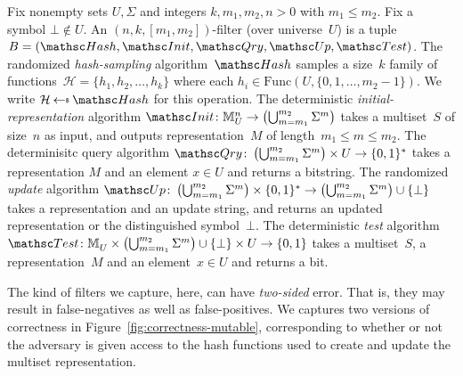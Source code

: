 Fix nonempty sets $U,\Sigma$ and integers $k,m_1,m_2,n>0$ with $m_1 \leq m_2$.  Fix a symbol $\bot \not\in U$.  An $(n,k,[m_1,m_2])$-filter (over universe~$U$) is a tuple  $B=(\Hash,\Init,\Qry,\Update, \Test)$.   
%
The randomized \emph{hash-sampling} algorithm~$\Hash$ samples a size~$k$ family of functions~$\mathcal{H}=\{h_1,h_2,\ldots,h_k\}$ where each $h_i \in  \mathrm{Func}(U,\{0,1,\ldots,m_2-1\})$.  We write $\mathcal{H} \getsr \Hash$ for this operation. 
%
The deterministic \emph{initial-representation} algorithm $\Init\colon \multiset{U}{n} \rightarrow \left(\bigcup_{m=m_1}^{m_2}\Sigma^m\right)$ takes a multiset~$S$ of size~$n$ as input, and outputs representation~$M$ of length~$m_1 \leq m \leq m_2$.
%
The determinisitc query algorithm $\Qry\colon \left(\bigcup_{m=m_1}^{m_2}\Sigma^m \right)\times U \rightarrow \bits^*$ takes a representation $M$ and an element $x \in U$ and returns a bitstring.  
%
The randomized \emph{update} algorithm $\Update\colon \left(\bigcup_{m=m_1}^{m_2}\Sigma^m \right)\times \bits^* \rightarrow \left(\bigcup_{m=m_1}^{m_2}\Sigma^m \right) \cup \{\bot\}$ takes a representation and an update string, and returns an updated representation or the distinguished symbol~$\bot$.  
%
The deterministic \emph{test} algorithm $\Test \colon \multiset{U}{} \times \left(\bigcup_{m=m_1}^{m_2}\Sigma^m \right)\cup\{\bot\} \times U \rightarrow \bits$ takes a multiset~$S$, a representation~$M$ and an element~$x \in U$ and returns a bit.
%

 The kind of filters we capture, here, can have \emph{two-sided} error.  That is, they may result in false-negatives as well as false-positives.  We captures two versions of correctness in Figure~\ref{fig:correctness-mutable}, corresponding to whether or not the adversary is given access to the hash functions used to create and update the multiset representation.

